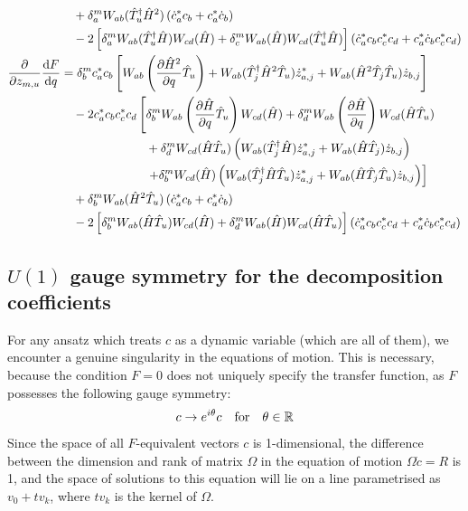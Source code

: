\documentclass[12pt]{article}
\newcommand{\hc}{^\dagger}
\begin{document}
\begin{align}
	&\quad + \delta_a^m W_{ab}(\hat{T}_u\hc\hat{H}^2) \left(\dot{c}_a^* c_b + c_a^* \dot{c}_b\right) \nonumber\\
	&\quad - 2 \left[ \delta_a^m W_{ab}(\hat{T}_u\hc\hat{H}) W_{cd}(\hat{H}) + \delta_c^m W_{ab}(\hat{H}) W_{cd}(\hat{T}_u\hc\hat{H}) \right] \left( \dot{c}_a^* c_b c_c^* c_d + c_a^* \dot{c}_b c_c^* c_d \right)\\
	\pdv{z_{m,u}}\dv{F}{q} &= \delta_b^m c_a^* c_b \left[  W_{ab}\left(\pdv{\hat{H}^2}{q}\hat{T}_u\right) + W_{ab}(\hat{T}_j\hc \hat{H}^2\hat{T}_u) \dot{z}_{a,j}^* + W_{ab}(\hat{H}^2 \hat{T}_j\hat{T}_u) \dot{z}_{b,j}\right] \nonumber\\
	&\quad -2 c_a^* c_b c_c^* c_d \left[ \delta_b^m W_{ab}\left(\pdv{\hat{H}}{q}\hat{T}_u\right) W_{cd}(\hat{H}) + \delta_d^m W_{ab}\left(\pdv{\hat{H}}{q}\right) W_{cd}(\hat{H}\hat{T}_u) \right.\nonumber\\
	&\qquad\qquad\qquad\quad + \delta_d^m W_{cd}(\hat{H}\hat{T}_u) \left( W_{ab}(\hat{T}_j\hc \hat{H}) \dot{z}_{a,j}^* + W_{ab}(\hat{H} \hat{T}_j) \dot{z}_{b,j} \right) \nonumber\\
	&\qquad\qquad\qquad\quad \left.+ \delta_b^m W_{cd}(\hat{H}) \left( W_{ab}(\hat{T}_j\hc \hat{H}\hat{T}_u) \dot{z}_{a,j}^* + W_{ab}(\hat{H} \hat{T}_j\hat{T}_u) \dot{z}_{b,j} \right) \right] \nonumber\\
	&\quad + \delta_b^m W_{ab}(\hat{H}^2\hat{T}_u) \left(\dot{c}_a^* c_b + c_a^* \dot{c}_b\right) \nonumber\\
	&\quad - 2 \left[ \delta_b^m W_{ab}(\hat{H}\hat{T}_u) W_{cd}(\hat{H}) + \delta_d^m W_{ab}(\hat{H}) W_{cd}(\hat{H}\hat{T}_u) \right] \left( \dot{c}_a^* c_b c_c^* c_d + c_a^* \dot{c}_b c_c^* c_d \right)
	\end{align}
	
	\subsection{$U(1)$ gauge symmetry for the decomposition coefficients}
	
	For any ansatz which treats $c$ as a dynamic variable (which are all of them), we encounter a genuine singularity in the equations of motion. This is necessary, because the condition $F = 0$ does not uniquely specify the transfer function, as $F$ possesses the following gauge symmetry:
	\begin{equation}
	c \to e^{i\theta} c \qq{for} \theta \in \mathbb{R}
	\end{equation}
	Since the space of all $F$-equivalent vectors $c$ is 1-dimensional, the difference between the dimension and rank of matrix $\Omega$ in the equation of motion $\Omega \dot{c} = R$ is 1, and the space of solutions to this equation will lie on a line parametrised as $v_0 + tv_k$, where $tv_k$ is the kernel of $\Omega$.
	
\end{document}
